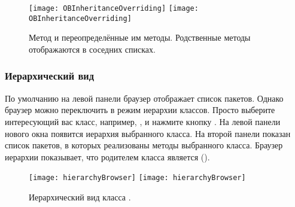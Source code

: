 \documentclass[a4paper,10pt,twoside]{book}
\begin{document}
\begin{figure}[btp]
	\begin{center}
   \ifluluelse
		{\texttt{[image: OBInheritanceOverriding]}}
		{\texttt{[image: OBInheritanceOverriding]}}
	\end{center}
	\caption{Метод  и переопределённые им методы. Родственные методы отображаются в соседних списках.}
\end{figure}

\subsubsection{Иерархический вид}


По умолчанию на левой панели браузер отображает список пакетов. Однако браузер можно переключить в режим иерархии классов. Просто выберите интересующий вас класс, например, , и нажмите кнопку . На левой панели нового окна появится иерархия выбранного класса. На второй панели показан список пакетов, в которых реализованы методы выбранного класса. Браузер иерархии показывает, что родителем класса  является  ().

\begin{figure}[btp]
	\begin{center}
	\ifluluelse
		{\texttt{[image: hierarchyBrowser]}}
		{\texttt{[image: hierarchyBrowser]}}
	\end{center}
	\caption{Иерархический вид класса .}
\end{figure}
\end{document}
